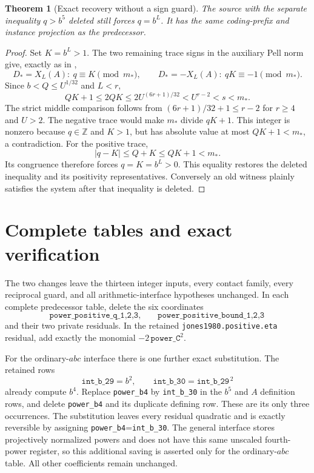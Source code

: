 \documentclass[11pt]{article}
\newtheorem{theorem}{Theorem}
\newcommand{\Z}{\mathbb Z}\newcommand{\Q}{\mathbb Q}
\begin{document}
\begin{theorem}[Exact recovery without a sign guard]\label{thm:signed-q}
The source with the separate inequality \(q>b^5\) deleted
still forces \(q=b^L\). It has the same coding-prefix and
instance projection as the predecessor.
\end{theorem}
\begin{proof}
Set \(K=b^L>1\). The two remaining trace signs in the auxiliary
Pell norm give, exactly as in \cite{Power},
\[
 D_*=X_L(A):\ q\equiv K\pmod{m_*},\qquad
 D_*=-X_L(A):\ qK\equiv-1\pmod{m_*}.
\]
Since \(b<Q\le U^{1/32}\) and \(L<r\),
\[
 QK+1\le2QK\le2U^{(6r+1)/32}<U^{r-2}<s<m_*.
\]
The strict middle comparison follows from
\((6r+1)/32+1\le r-2\) for \(r\ge4\) and \(U>2\).
The negative trace would make \(m_*\) divide \(qK+1\).
This integer is nonzero because \(q\in\Z\) and \(K>1\),
but has absolute value at most \(QK+1<m_*\), a contradiction.
For the positive trace,
\[
                  |q-K|\le Q+K\le QK+1<m_*.
\]
Its congruence therefore forces \(q=K=b^L>0\).
This equality restores the deleted inequality and its positivity
representatives. Conversely an old witness plainly satisfies the
system after that inequality is deleted.
\end{proof}



\section{Complete tables and exact verification}

The two changes leave the thirteen integer inputs, every contact
family, every reciprocal guard, and all arithmetic-interface
hypotheses unchanged. In each complete predecessor table, delete
the six coordinates
\[
 \texttt{power\_positive\_q\_1,2,3},\qquad
 \texttt{power\_positive\_bound\_1,2,3}
\]
and their two private residuals. In the retained
\texttt{jones1980.positive.eta} residual, add exactly the monomial
\(-2\,\texttt{power\_C}^2\).

For the ordinary-\(abc\) interface there is one further exact
substitution. The retained rows
\[
 \texttt{int\_b\_29}=b^2,\qquad
 \texttt{int\_b\_30}=\texttt{int\_b\_29}^{\,2}
\]
already compute \(b^4\). Replace \texttt{power\_b4} by
\texttt{int\_b\_30} in the \(b^5\) and \(A\) definition rows,
and delete \texttt{power\_b4} and its duplicate defining row.
These are its only three occurrences. The substitution leaves every
residual quadratic and is exactly reversible by assigning
\texttt{power\_b4}=\texttt{int\_b\_30}. The general interface
stores projectively normalized powers and does not have this same
unscaled fourth-power register, so this additional saving is asserted
only for the ordinary-\(abc\) table. All other coefficients remain
unchanged.
\end{document}
